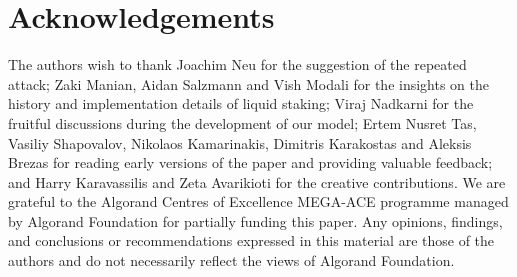 \section*{Acknowledgements}

The authors wish to thank Joachim Neu for the suggestion of the repeated attack;
Zaki Manian, Aidan Salzmann and Vish Modali for the insights on the history and
implementation details of liquid staking;
Viraj Nadkarni for the fruitful discussions during the
development of our model; Ertem Nusret Tas, Vasiliy Shapovalov,
Nikolaos Kamarinakis, Dimitris Karakostas and Aleksis Brezas for reading
early versions of the paper and providing valuable feedback; and Harry Karavassilis
and Zeta Avarikioti for the creative contributions.
We are grateful to the Algorand Centres of Excellence MEGA-ACE programme managed
by Algorand Foundation for partially funding this paper. Any opinions, findings,
and conclusions or recommendations expressed in this material are those of the authors
and do not necessarily reflect the views of Algorand Foundation.
